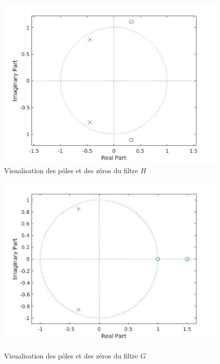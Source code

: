 \documentclass[12,french]{report}
\begin{document}
\begin{figure}[H]
    \begin{minipage}[c]{.50\linewidth}
        \centering
        \includegraphics[width=1\textwidth]{./Images/zplane_H}\\
        \caption{Visualisation des pôles et des zéros du filtre $H$}
    \end{minipage}
    \hfill%
    \begin{minipage}[c]{.50\linewidth}
        \centering
        \includegraphics[width=1\textwidth]{./Images/zplane_G}\\
        \caption{Visualisation des pôles et des zéros du filtre $G$}
    \end{minipage}
\end{figure}\vspace{0.3cm}
\end{document}
